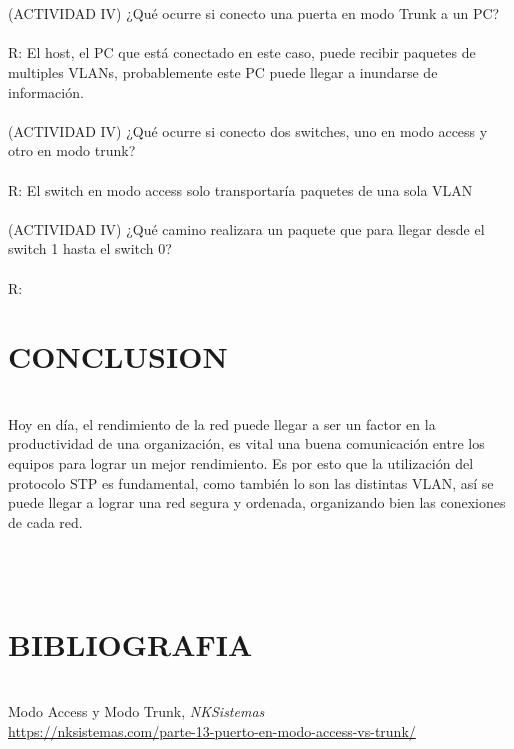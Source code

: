 \documentclass[onecolumn,12pt]{IEEEtran}
\begin{document}
\\ \\
(ACTIVIDAD IV) ¿Qué ocurre si conecto una puerta en modo Trunk a un PC?\\ \\
R: El host, el PC que está conectado en este caso, puede recibir paquetes de multiples VLANs, probablemente este PC puede llegar a inundarse de información.
\\ \\
(ACTIVIDAD IV) ¿Qué ocurre si conecto dos switches, uno en modo access y otro en modo trunk?\\ \\
R: El switch en modo access solo transportaría paquetes de una sola VLAN
\\ \\
(ACTIVIDAD IV) ¿Qué camino realizara un paquete que para llegar desde el switch 1 hasta el switch 0?\\ \\
R: 

\newpage
\section{CONCLUSION}
\hfill \\

Hoy en día, el rendimiento de la red puede llegar a ser un factor en la productividad de una organización, es vital una buena comunicación entre los equipos para lograr un mejor rendimiento. Es por esto que la utilización del protocolo STP es fundamental, como también lo son las distintas VLAN, así se puede llegar a lograr una red segura y ordenada, organizando bien las conexiones de cada red.



\hfill \\
\hfill \\
\section{BIBLIOGRAFIA}
\hfill \\
Modo Access y Modo Trunk,
\emph{NKSistemas} \\
\url{https://nksistemas.com/parte-13-puerto-en-modo-access-vs-trunk/}
\end{document}
